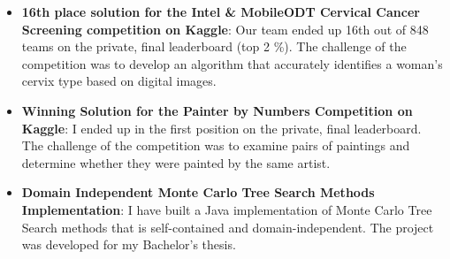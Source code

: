 \documentclass[letterpaper,11pt]{article}
\newcommand{\resumeItem}[2]{
  \item\small{
    \textbf{#1}{: #2 \vspace{-2pt}}
  }
}
\newcommand{\resumeSubItem}[2]{\resumeItem{#1}{#2}\vspace{-4pt}}
\newcommand{\resumeSubHeadingListStart}{\begin{itemize}[leftmargin=*]}
\newcommand{\resumeSubHeadingListEnd}{\end{itemize}}
\begin{document}
  \resumeSubHeadingListStart
    \resumeSubItem{16th place solution for the Intel \& MobileODT Cervical Cancer Screening competition on Kaggle}
      { Our team ended up 16th out of 848 teams on the private, final leaderboard (top 2 \%). The challenge of the competition was to develop an algorithm that accurately identifies a woman’s cervix type based on digital images.}
  \resumeSubHeadingListEnd

  \resumeSubHeadingListStart
    \resumeSubItem{Winning Solution for the Painter by Numbers Competition on Kaggle}
      {I ended up in the first position on the private, final leaderboard. The challenge of the competition was to examine pairs of paintings and determine whether they were painted by the same artist.}
  \resumeSubHeadingListEnd

  \resumeSubHeadingListStart
    \resumeSubItem{Domain Independent Monte Carlo Tree Search Methods Implementation}
      {I have built a Java implementation of Monte Carlo Tree Search methods that is self-contained and domain-independent. The project was developed for my Bachelor’s thesis.}
  \resumeSubHeadingListEnd


\end{document}
